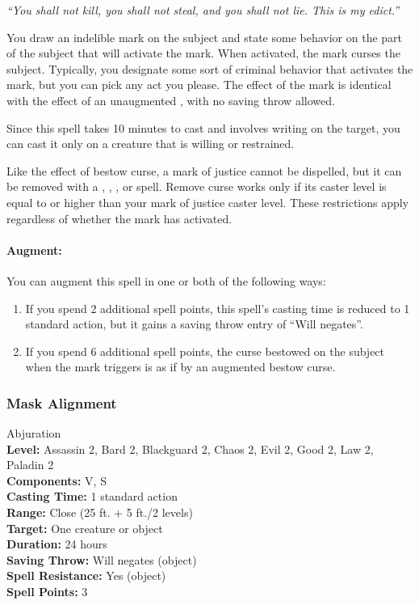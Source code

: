 \emph{``You shall not kill, you shall not steal, and you shall not lie. This is my edict.''}

You draw an indelible mark on the subject and state some behavior on the part of the subject that will activate the mark. 
When activated, the mark curses the subject. 
Typically, you designate some sort of criminal behavior that activates the mark, but you can pick any act you please. 
The effect of the mark is identical with the effect of an unaugmented , with no saving throw allowed.

Since this spell takes 10 minutes to cast and involves writing on the target, 
you can cast it only on a creature that is willing or restrained.

Like the effect of bestow curse, a mark of justice cannot be dispelled, but it can be removed with a 
, , , or  spell. 
Remove curse works only if its caster level is equal to or higher than your mark of justice caster level. 
These restrictions apply regardless of whether the mark has activated.

\paragraph{Augment:} You can augment this spell in one or both of the following ways:
\begin{enumerate}
 \item If you spend 2 additional spell points, this spell's casting time is reduced to 1 standard action, 
 but it gains a saving throw entry of ``Will negates''.
 \item If you spend 6 additional spell points, the curse bestowed on the subject when the mark triggers is as if by an augmented bestow curse.
\end{enumerate}

\subsubsection{Mask Alignment}
\label{Spell:MaskAlignment}
Abjuration
\\ \textbf{Level:} Assassin 2, Bard 2, Blackguard 2, Chaos 2, Evil 2, Good 2, Law 2, Paladin 2
\\ \textbf{Components:} V, S
\\ \textbf{Casting Time:} 1 standard action
\\ \textbf{Range:} Close (25 ft. + 5 ft./2 levels)
\\ \textbf{Target:} One creature or object
\\ \textbf{Duration:} 24 hours
\\ \textbf{Saving Throw:} Will negates (object)
\\ \textbf{Spell Resistance:} Yes (object)
\\ \textbf{Spell Points:} 3

